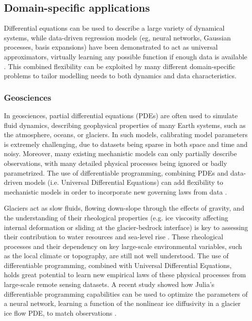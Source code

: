 \subsection{Domain-specific applications}

Differential equations can be used to describe a large variety of dynamical systems, while data-driven regression models (eg, neural networks, Gaussian processes, basis expansions) have been demonstrated to act as universal approximators, virtually learning any possible function if enough data is available \cite{gorban_1998}. 
This combined flexibility can be exploited by many different domain-specific problems to tailor modelling needs to both dynamics and data characteristics.

\subsubsection{Geosciences}

In geosciences, partial differential equations (PDEs) are often used to simulate fluid dynamics, describing geophysical properties of many Earth systems, such as the atmosphere, oceans, or glaciers.
In such models, calibrating model parameters is extremely challenging, due to datasets being sparse in both space and time and noisy.
Moreover, many existing mechanistic models can only partially describe observations, with many detailed physical processes being ignored or badly parametrized. 
The use of differentiable programming, combining PDEs and data-driven models (i.e. Universal Differential Equations) can add flexibility to mechanistic models in order to incorporate new governing laws from data \cite{rackauckas2020universal}.


Glaciers act as slow fluids, flowing down-slope through the effects of gravity, and the understanding of their rheological properties (e.g. ice viscosity affecting internal deformation or sliding at the glacier-bedrock interface) is key to assessing their contribution to water resources and sea-level rise \cite{cuffey_physics_2010}. 
These rheological processes and their dependency on key large-scale environmental variables, such as the local climate or topography, are still not well understood.
The use of differentiable programming, combined with Universal Differential Equations, holds great potential to learn new empirical laws of these physical processes from large-scale remote sensing datasets. 
A recent study showed how Julia's differentiable programming capabilities can be used to optimize the parameters of a neural network, learning a function of the nonlinear ice diffusivity in a glacier ice flow PDE, to match observations \cite{bolibar_universal_2023}.
